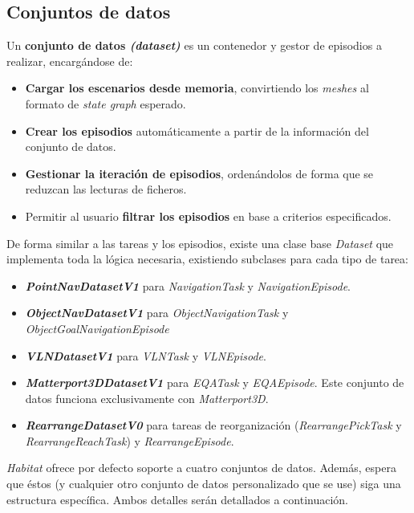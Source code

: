 \subsection{Conjuntos de datos}

Un \textbf{conjunto de datos \textit{(dataset)}} es un contenedor y gestor de episodios a realizar, encargándose de:

\begin{itemize}
	\item \textbf{Cargar los escenarios desde memoria}, convirtiendo los \textit{meshes} al formato de \textit{state graph} esperado.
	\item \textbf{Crear los episodios} automáticamente a partir de la información del conjunto de datos.
	\item \textbf{Gestionar la iteración de episodios}, ordenándolos de forma que se reduzcan las lecturas de ficheros.
	\item Permitir al usuario \textbf{filtrar los episodios} en base a criterios especificados.
\end{itemize}

De forma similar a las tareas y los episodios, existe una clase base \textit{Dataset} que implementa toda la lógica necesaria, existiendo subclases para cada tipo de tarea:

\begin{itemize}
\item \textbf{\textbf{\textit{PointNavDatasetV1}}} para \textit{NavigationTask} y \textit{NavigationEpisode}.
\item \textbf{\textit{ObjectNavDatasetV1}} para \textit{ObjectNavigationTask} y \textit{ObjectGoalNavigationEpisode}
\item \textbf{\textit{VLNDatasetV1}} para \textit{VLNTask} y \textit{VLNEpisode}.
\item \textbf{\textit{Matterport3DDatasetV1}} para \textit{EQATask} y \textit{EQAEpisode}. Este conjunto de datos funciona exclusivamente con \textit{Matterport3D}.
\item \textbf{\textit{RearrangeDatasetV0}} para tareas de reorganización (\textit{RearrangePickTask} y \textit{RearrangeReachTask}) y \textit{RearrangeEpisode}.
\end{itemize}

\textit{Habitat} ofrece por defecto soporte a cuatro conjuntos de datos. Además, espera que éstos (y cualquier otro conjunto de datos personalizado que se use) siga una estructura específica. Ambos detalles serán detallados a continuación.

